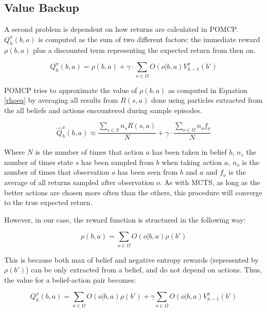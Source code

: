 %

\subsection{Value Backup}

A second problem is dependent on how returns are calculated in POMCP. $Q^\pi_h(b,a)$ is computed as the
sum of two different factors: the immediate reward $\rho(b,a)$ plus a discounted term representing
the expected return from then on.

\[ Q^\pi_h(b,a) = \rho(b,a) + \gamma \cdot \sum_{o\in \Omega} O(o|b,a) V^\pi_{h-1}(b') \]

POMCP tries to approximate the value of $\rho(b,a)$ as computed in Equation \ref{rhoeq} by averaging
all results from $R(s,a)$ done using particles extracted from the all beliefs and actions
encountered during sample episodes.

\[ \hat{Q}^\pi_h(b,a) \approx \frac{\sum_{s \in S} n_s R(s,a)}{N} + \gamma \cdot \frac{\sum_{o\in \Omega} n_o f_o}{N} \]

Where $N$ is the number of times that action $a$ has been taken in belief $b$, $n_s$ the number of
times state $s$ has been sampled from $b$ when taking action $a$, $n_o$ is the number of times that
observation $o$ has been seen from $b$ and $a$ and $f_o$ is the average of all returns sampled after
observation $o$. As with MCTS, as long as the better actions are chosen more often than the others,
this procedure will converge to the true expected return.

However, in our case, the reward function is structured in the following way:

\[ \rho(b,a) = \sum_{o\in \Omega} O(o | b, a) \rho(b') \]

This is because both max of belief and negative entropy rewards (represented by $\rho(b')$) can be
only extracted from a belief, and do not depend on actions. Thus, the value for a belief-action pair
becomes:

\[ Q^\pi_h(b,a) = \sum_{o\in \Omega} O(o | b,a) \rho(b') + \gamma\sum_{o\in\Omega} O(o|b,a) V^\pi_{h-1}(b') \]

